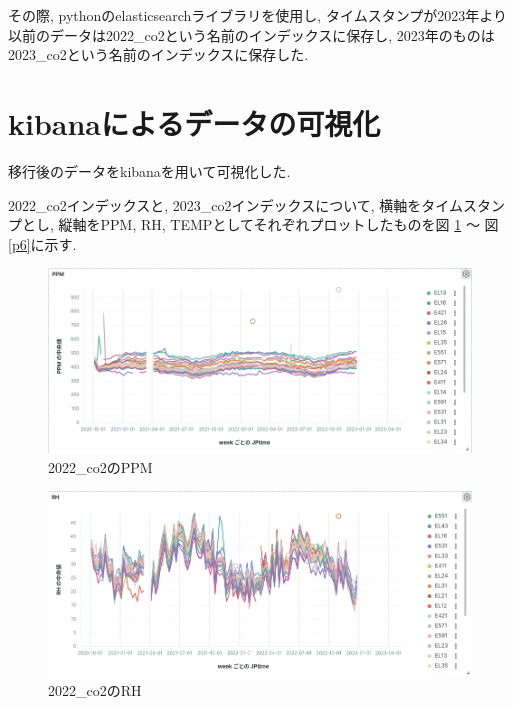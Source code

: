 その際, pythonのelasticsearchライブラリを使用し, タイムスタンプが2023年より以前のデータは2022\_co2という名前のインデックスに保存し, 2023年のものは2023\_co2という名前のインデックスに保存した.

\section{kibanaによるデータの可視化}

移行後のデータをkibanaを用いて可視化した.

2022\_co2インデックスと, 2023\_co2インデックスについて, 横軸をタイムスタンプとし, 縦軸をPPM, RH, TEMPとしてそれぞれプロットしたものを図 \ref{p1} 〜 図 \ref{p6}に示す.

\begin{figure}[!ht]
    \begin{center}
        \includegraphics[width=160mm]{sotu/figure/2022_ppm.png}
        \caption{2022\_co2のPPM}
        \label{p1}
    \end{center}
\end{figure}

\begin{figure}[!ht]
    \begin{center}
        \includegraphics[width=160mm]{sotu/figure/2022_rh.png}
        \caption{2022\_co2のRH}
        \label{p2}
    \end{center}
\end{figure}

